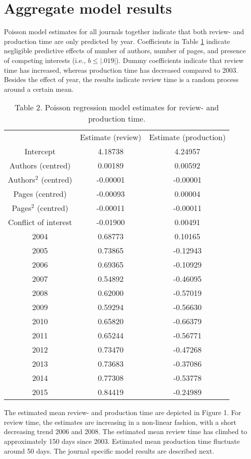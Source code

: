 \section*{Aggregate model results}
Poisson model estimates for all journals together indicate that both review- and production time are only predicted by year. Coefficients in Table \ref{tab:tab2} indicate negligible predictive effects of number of authors, number of pages, and presence of competing interests (i.e., $b \leq |.019|$). Dummy coefficients indicate that review time has increased, whereas production time has decreased compared to 2003. Besides the effect of year, the results indicate review time is a random process around a certain mean.

\begin{table}
\caption{Table 2. Poisson regression model estimates for review- and production time.}
\label{tab:tab2}
\begin{tabular}{ c c c }
    & Estimate (review) & Estimate (production) \\
    Intercept & 4.18738 & 4.24957 \\
    Authors (centred) & 0.00189 & 0.00592 \\
    Authors$^2$ (centred) & -0.00001 & -0.00001 \\
    Pages (centred) & -0.00093 & 0.00004 \\
    Pages$^2$ (centred) & -0.00011 & -0.00011 \\
    Conflict of interest & -0.01900 & 0.00491 \\
    2004  & 0.68773 & 0.10165 \\
    2005  & 0.73865 & -0.12943 \\
    2006  & 0.69365 & -0.10929 \\
    2007  & 0.54892 & -0.46095 \\
    2008  & 0.62000 & -0.57019 \\
    2009  & 0.59294 & -0.56630 \\
    2010  & 0.65820 & -0.66379 \\
    2011  & 0.65244 & -0.56771 \\
    2012  & 0.73470 & -0.47268 \\
    2013  & 0.73683 & -0.37086 \\
    2014  & 0.77308 & -0.53778 \\
    2015  & 0.84419 & -0.24989 \\
\end{tabular}
\end{table}

The estimated mean review- and production time are depicted in Figure 1. For review time, the estimates are increasing in a non-linear fashion, with a short decreasing trend 2006 and 2008. The estimated mean review time has climbed to approximately 150 days since 2003. Estimated mean production time fluctuate around 50 days. The journal specific model results are described next.